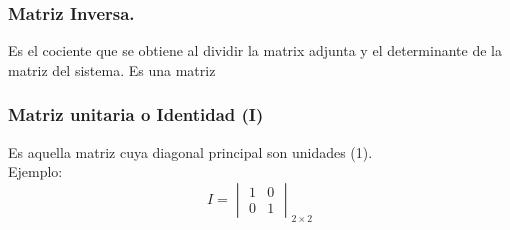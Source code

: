 \documentclass[12pt, a5paper]{article}
\begin{document}
\subsubsection*{Matriz Inversa.}
Es el cociente que se obtiene al dividir la matrix adjunta y el determinante de la matriz del sistema. Es una matriz

\subsubsection*{Matriz unitaria o Identidad (I)}
\noindent Es aquella matriz cuya diagonal principal son unidades (1). \\

\noindent Ejemplo:
$$
I = \begin{vmatrix} 1 & 0 \\ 0 & 1\end{vmatrix}_{2 \times 2}
$$
\end{document}

